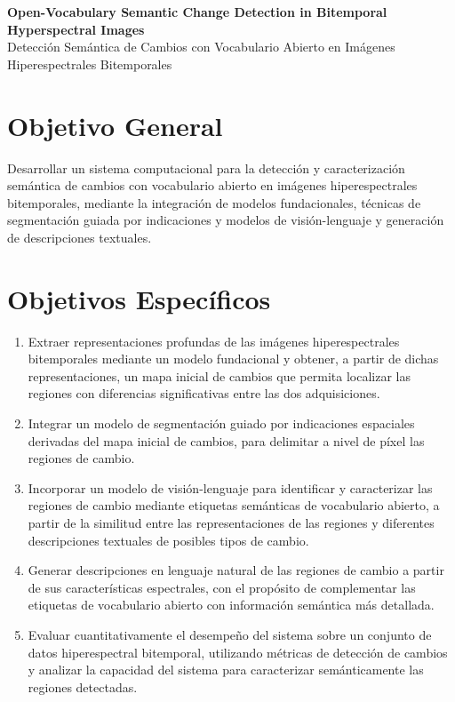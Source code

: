 \documentclass[12pt]{article}
\begin{document}
\begin{center}
{\Large\bfseries Open-Vocabulary Semantic Change Detection in Bitemporal Hyperspectral Images}\\[0.5cm]
{\large Detección Semántica de Cambios con Vocabulario Abierto en Imágenes Hiperespectrales Bitemporales}
\end{center}
\vspace{0.6cm}

\section*{Objetivo General}

Desarrollar un sistema computacional para la detección y caracterización semántica de cambios con vocabulario abierto en imágenes hiperespectrales bitemporales, mediante la integración de modelos fundacionales, técnicas de segmentación guiada por indicaciones y modelos de visión-lenguaje y generación de descripciones textuales.

\section*{Objetivos Específicos}

\begin{enumerate}
    \item Extraer representaciones profundas de las imágenes hiperespectrales bitemporales mediante un modelo fundacional y obtener, a partir de dichas representaciones, un mapa inicial de cambios que permita localizar las regiones con diferencias significativas entre las dos adquisiciones.
    \item Integrar un modelo de segmentación guiado por indicaciones espaciales derivadas del mapa inicial de cambios, para delimitar a nivel de píxel las regiones de cambio.
    \item Incorporar un modelo de visión-lenguaje para identificar y caracterizar las regiones de cambio mediante etiquetas semánticas de vocabulario abierto, a partir de la similitud entre las representaciones de las regiones y diferentes descripciones textuales de posibles tipos de cambio.
    \item Generar descripciones en lenguaje natural de las regiones de cambio a partir de sus características espectrales, con el propósito de complementar las etiquetas de vocabulario abierto con información semántica más detallada.
    \item Evaluar cuantitativamente el desempeño del sistema sobre un conjunto de datos hiperespectral bitemporal, utilizando métricas de detección de cambios y analizar la capacidad del sistema para caracterizar semánticamente las regiones detectadas.
\end{enumerate}
\end{document}
